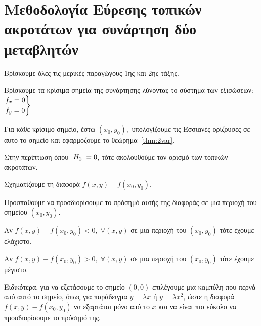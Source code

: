 \section{Μεθοδολογία Εύρεσης τοπικών ακροτάτων για συνάρτηση δύο μεταβλητών}

\begin{enumerate}
    \item Βρίσκουμε όλες τις μερικές παραγώγους 1ης και 2ης τάξης.
    \item Βρίσκουμε τα κρίσιμα σημεία της συνάρτησης λύνοντας το σύστημα των εξισώσεων: 
        $ \begin{rcases}
            f_{x} = 0 \\
            f_{y} = 0  
        \end{rcases} $
    \item Για κάθε κρίσιμο σημείο, έστω $ (x_{0}, y_{0}), $ υπολογίζουμε τις Εσσιανές 
        ορίζουσες σε αυτό το σημείο και εφαρμόζουμε το θεώρημα~\ref{thm:2var}.
    \item Στην περίπτωση όπου $ \abs{H_{2}} = 0 $, τότε ακολουθούμε τον ορισμό των 
        τοπικών ακροτάτων.
        \begin{myitemize}
            \item Σχηματίζουμε τη διαφορά $ f(x,y) - f(x_{0}, y_{0}) $.
            \item Προσπαθούμε να προσδιορίσουμε το πρόσημό αυτής της διαφοράς σε 
                μια περιοχή του σημείου $ (x_{0}, y_{0}) $.
                \begin{myitemize}
                    \item Αν $ f(x,y) - f(x_{0}, y_{0}) < 0, \; \forall (x,y) $ σε μια
                        περιοχή του $ (x_{0}, y_{0}) $ τότε έχουμε ελάχιστο. 
                    \item Αν $ f(x,y) - f(x_{0}, y_{0}) > 0, \; \forall (x,y) $ σε μια
                        περιοχή του $ (x_{0}, y_{0}) $ τότε έχουμε μέγιστο. 
                \end{myitemize}
            \item Ειδικότερα, για να εξετάσουμε το σημείο $ (0,0) $ επιλέγουμε μια 
                καμπύλη που περνά από αυτό το σημείο, όπως για παράδειγμα 
                $ y= \lambda x $ ή $ y= \lambda x^{2} $, ώστε η διαφορά 
                $ f(x,y) - f(x_{0}, y_{0}) $ να εξαρτάται μόνο από το $x$ και να 
                είναι πιο εύκολο να προσδιορίσουμε το πρόσημό της.
        \end{myitemize}
\end{enumerate}

